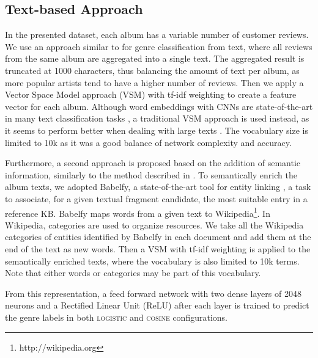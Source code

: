 \documentclass{article}
\begin{document}
\subsection{Text-based Approach}
\label{sec:text}
In the presented dataset, each album has a variable number of customer reviews. 
We use an approach similar to \cite{hu2005mining,oramas2016exploring} for genre classification from text, where all reviews from the same album are aggregated into a single text. 
The aggregated result is truncated at 1000 characters, thus balancing the amount of text per album, as more popular artists tend to have a higher number of reviews. Then we apply a Vector Space Model approach (VSM) with tf-idf weighting \cite{Zobel1998} to create a feature vector for each album. 
Although word embeddings \cite{Mikolov2013} with CNNs are state-of-the-art in many text classification tasks \cite{Kim2014}, a traditional VSM approach is used instead, as it seems to perform better when dealing with large texts \cite{Oramas2017}.
The vocabulary size is limited to 10k as it was a good balance of network complexity and accuracy.

Furthermore, a second approach is proposed based on the addition of semantic information, similarly to the method described in \cite{oramas2016exploring}. 
To semantically enrich the album texts, we adopted Babelfy, a state-of-the-art tool for entity linking \cite{Moroetal2014}, a task to associate, for a given textual fragment candidate, the most suitable entry in a reference KB. 
Babelfy maps words from a given text to Wikipedia\footnote{http://wikipedia.org}. 
In Wikipedia, categories are used to organize resources. We take all the Wikipedia categories of entities identified by Babelfy in each document and add them at the end of the text as new words. 
Then a VSM with tf-idf weighting is applied to the semantically enriched texts, where the vocabulary is also limited to 10k terms. 
Note that either words or categories may be part of this vocabulary. 


From this representation, a feed forward network with two dense layers of 2048 neurons and a Rectified Linear Unit (ReLU) after each layer is trained to predict the genre labels in both \textsc{logistic} and \textsc{cosine} configurations. 
\end{document}
